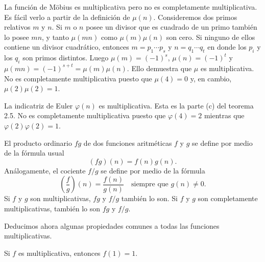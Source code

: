 \documentclass[12pt,a4paper]{book}
\begin{document}
    \begin{ejemplo}
        La función de Möbius es multiplicativa pero no es completamente multiplicativa. Es
        fácil verlo a partir de la definición de $\mu(n)$. Consideremos dos primos
        relativos $m$ y $n$. Si $m$ o $n$ posee un divisor que es cuadrado de un primo
        también lo posee $mn$, y tanto $\mu(mn)$ como $\mu(m)\mu(n)$ son cero. Si ninguno de
        ellos contiene un divisor cuadrático, entonces $m=p_{1}\cdots p_{s}$ y $n=q_{1}\cdots q_{t}$
        en donde los $p_{i}$ y los $q_{i}$ son primos distintos. Luego $\mu(m)=(-1)^{s}$,
        $\mu(n)=(-1)^{t}$ y $\mu(mn)=(-1)^{s+t}=\mu(m)\mu(n)$. Ello demuestra que $\mu$ es
        multiplicativa. No es completamente multiplicativa puesto que $\mu(4)=0$ y, en
        cambio, $\mu(2)\mu(2)=1$.
    \end{ejemplo}

    \begin{ejemplo}
        La indicatriz de Euler $\varphi(n)$ es multiplicativa. Esta es la parte (c) del
        teorema 2.5. No es completamente multiplicativa puesto que $\varphi(4)=2$ mientras
        que $\varphi(2)\varphi(2)=1$.
    \end{ejemplo}

    \begin{ejemplo}
        El producto ordinario $fg$ de dos funciones aritméticas $f$ y $g$ se define por
        medio de la fórmula usual
        \begin{equation*}
            (fg)(n)=f(n)g(n).
        \end{equation*}
        Análogamente, el cociente $f/g$ se define por medio de la fórmula
        \begin{equation*}
            \left(\frac{f}{g}\right)(n)=\frac{f(n)}{g(n)}\quad\text{siempre que } g(n)\neq0.
        \end{equation*}
        Si $f$ y $g$ son multiplicativas, $fg$ y $f/g$ también lo son. Si $f$ y $g$ son
        completamente multiplicativas, también lo son $fg$ y $f/g$.
    \end{ejemplo}

    Deducimos ahora algunas propiedades comunes a todas las funciones multiplicativas.

    \begin{teorema}
        Si $f$ es multiplicativa, entonces $f(1)=1$.
    \end{teorema}
\end{document}
